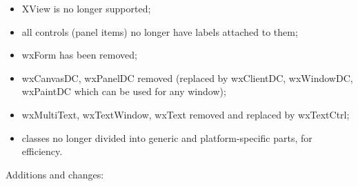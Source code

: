 \begin{itemize}\itemsep=0pt
\item XView is no longer supported;
\item all controls (panel items) no longer have labels attached to them;
\item wxForm has been removed;
\item wxCanvasDC, wxPanelDC removed (replaced by wxClientDC, wxWindowDC, wxPaintDC which
can be used for any window);
\item wxMultiText, wxTextWindow, wxText removed and replaced by wxTextCtrl;
\item classes no longer divided into generic and platform-specific parts, for efficiency.
\end{itemize}

Additions and changes:


